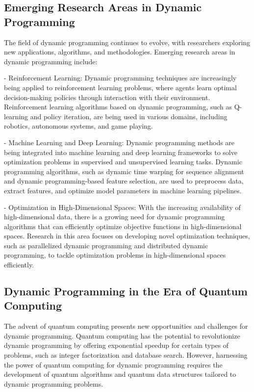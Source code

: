 \documentclass[12pt]{book} %
\begin{document}
\subsection{Emerging Research Areas in Dynamic Programming}

The field of dynamic programming continues to evolve, with researchers exploring new applications, algorithms, and methodologies. Emerging research areas in dynamic programming include:

- Reinforcement Learning: Dynamic programming techniques are increasingly being applied to reinforcement learning problems, where agents learn optimal decision-making policies through interaction with their environment. Reinforcement learning algorithms based on dynamic programming, such as Q-learning and policy iteration, are being used in various domains, including robotics, autonomous systems, and game playing.

- Machine Learning and Deep Learning: Dynamic programming methods are being integrated into machine learning and deep learning frameworks to solve optimization problems in supervised and unsupervised learning tasks. Dynamic programming algorithms, such as dynamic time warping for sequence alignment and dynamic programming-based feature selection, are used to preprocess data, extract features, and optimize model parameters in machine learning pipelines.

- Optimization in High-Dimensional Spaces: With the increasing availability of high-dimensional data, there is a growing need for dynamic programming algorithms that can efficiently optimize objective functions in high-dimensional spaces. Research in this area focuses on developing novel optimization techniques, such as parallelized dynamic programming and distributed dynamic programming, to tackle optimization problems in high-dimensional spaces efficiently.

\subsection{Dynamic Programming in the Era of Quantum Computing}

The advent of quantum computing presents new opportunities and challenges for dynamic programming. Quantum computing has the potential to revolutionize dynamic programming by offering exponential speedup for certain types of problems, such as integer factorization and database search. However, harnessing the power of quantum computing for dynamic programming requires the development of quantum algorithms and quantum data structures tailored to dynamic programming problems.
\end{document}
